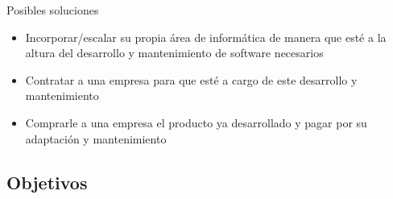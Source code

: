 \documentclass[10pt]{beamer}
\begin{document}
\begin{frame}{Posibles soluciones}
    \begin{itemize}
        \item Incorporar/escalar su propia área de informática de manera que esté a la altura del desarrollo y mantenimiento de software necesarios
        \item Contratar a una empresa para que esté a cargo de este desarrollo y mantenimiento
        \item Comprarle a una empresa el producto ya desarrollado y pagar por su adaptación y mantenimiento
    \end{itemize}
\end{frame}

\subsection{Objetivos}
\end{document}
